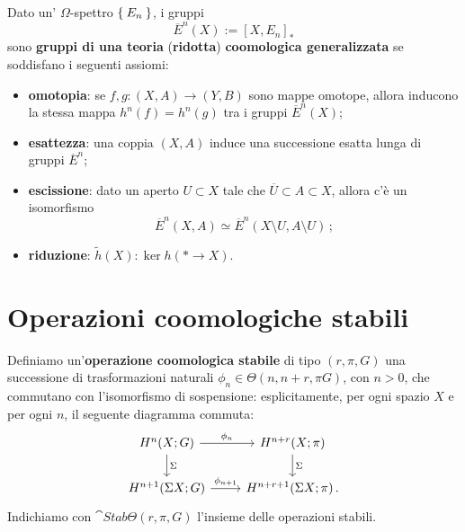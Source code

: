 \begin{df}
	Dato un' $\Omega$-spettro $\Set{E_{n}}$, i gruppi 
	\begin{equation*}
		\overline{E}^{n}(X) := [X,E_{n}]_{\ast}
	\end{equation*}
	sono \textbf{gruppi di una teoria} (\textbf{ridotta}) \textbf{coomologica generalizzata}
	se soddisfano i seguenti assiomi:
	\begin{itemize}
		\item \textbf{omotopia}: se $f,g:(X,A) \to (Y,B)$ sono mappe omotope, 
		allora inducono la stessa mappa $h^{n}(f) = h^{n}(g)$ tra i gruppi $\overline{E}^{n}(X)$;
		
		\item \textbf{esattezza}: una coppia $(X,A)$ induce una successione esatta
		lunga di gruppi $\overline{E}^{n}$;
		
		\item \textbf{escissione}: dato un aperto $U \subset X$ tale che 
		$\overline{U} \subset A \subset X$, allora c'è un isomorfismo
		\begin{equation*}
			\overline{E}^{n}(X,A) \simeq \overline{E}^{n}(X \setminus U, A \setminus U)\,;
		\end{equation*}
		\item \textbf{riduzione}: $\widetilde{h}(X) : \ker h(\ast \to X)$.
	\end{itemize}
\end{df}


\section{Operazioni coomologiche stabili}

	\begin{df}
		Definiamo un'\textbf{operazione coomologica stabile} di tipo
		$(r,\pi,G)$ una successione di trasformazioni naturali 
		$\phi_{n} \in \Theta(n,n+r, \pi G)$, con $n > 0$, che
		commutano con l'isomorfismo di sospensione:
		esplicitamente, per ogni spazio $X$ e per ogni $n$,
		il seguente diagramma commuta:
		\begin{equation*}
			\begin{tikzcd}
				H^{n}(X;G) \ar[r, "\phi_{n}"] \ar[d, "\Sigma"]
				& H^{n+r}(X;\pi) \ar[d, "\Sigma"] \\
				H^{n+1}(\Sigma X;G) \ar[r, "\phi_{n+1}"] 
				& H^{n+r+1}(\Sigma X;\pi) \,. 
			\end{tikzcd}
		\end{equation*}
		Indichiamo con $\cat{Stab}\Theta(r,\pi,G)$ l'insieme delle
		operazioni stabili.
	\end{df}
	
